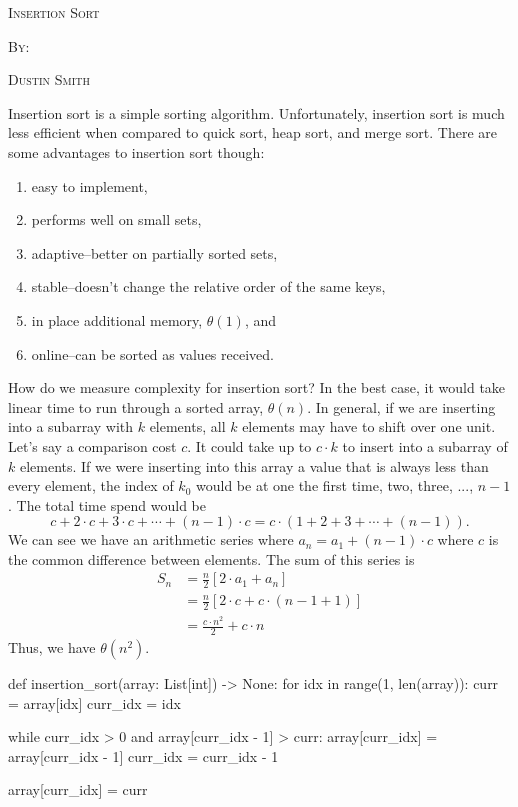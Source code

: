 \documentclass[12pt,dvipsnames,svgnames,x11names]{article}
\begin{document}
%
\pagecolor{gray!50}
\begin{center}
  \begin{center}
  \vspace*{\fill}
  \textsc{\LARGE Insertion Sort}
  \par\bigskip
  \textsc{By:}
  \par\bigskip
  \textsc{\LARGE Dustin Smith}
  \vspace*{\fill}
\end{center}
\end{center}

\newpage

Insertion sort is a simple sorting algorithm. Unfortunately, insertion sort is much less efficient  when 
compared to quick sort, heap sort, and merge sort. There are some advantages to insertion sort though:
\begin{enumerate}
	\item easy to implement,
	\item performs well on small sets,
	\item adaptive--better on partially sorted sets,
	\item stable--doesn't change the relative order of the same keys,
	\item in place additional memory, \(\theta(1)\), and
	\item online--can be sorted as values received.
\end{enumerate}
How do we measure complexity for insertion sort? In the best case, it would take linear time to run 
through a sorted array, \(\theta(n)\). In general, if we are inserting into a subarray with \(k\) elements, all
\(k\) elements may have to shift over one unit. Let's say a comparison cost \(c\). It could take up to 
\(c\cdot k\) to insert into a subarray of \(k\) elements. If we were inserting into this array a value that is 
always less than every element, the index of \(k_0\) would be at one the first time, two, three, ..., \(n - 1\).
The total time spend would be
\[
	c + 2\cdot c + 3\cdot c + \cdots + (n - 1)\cdot c = c\cdot (1 + 2 + 3 + \cdots + (n - 1)).
\]
We can see we have an arithmetic series where \(a_n = a_1 + (n - 1)\cdot c\) where \(c\) is the common
difference between elements. The sum of this series is
\begin{align*}
	S_n & = \frac{n}{2}[2\cdot a_1 + a_n]\\
	& = \frac{n}{2}[2\cdot c + c\cdot(n - 1 + 1)]\\
	&= \frac{c\cdot n^2}{2} + c\cdot n
\end{align*}
Thus, we have \(\theta(n^2)\).
\begin{python}
def insertion_sort(array: List[int]) -> None:
  for idx in range(1, len(array)):
    curr = array[idx]
    curr_idx = idx
    
    while curr_idx > 0 and array[curr_idx - 1] > curr:
      array[curr_idx] = array[curr_idx - 1]
      curr_idx = curr_idx - 1
      
    array[curr_idx] = curr
\end{python}
\end{document}
